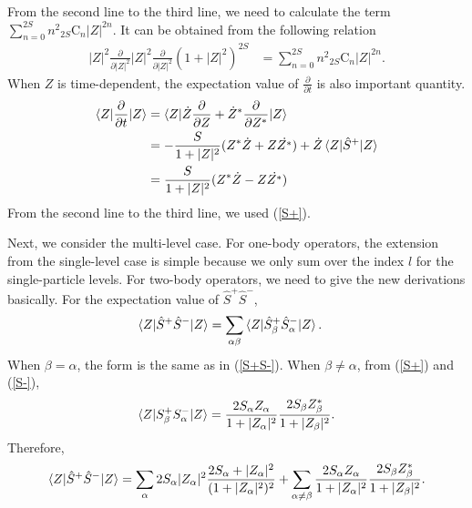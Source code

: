 \documentclass[11pt]{book} %
\begin{document}
From the second line to the third line, we need to calculate the term $\sum_{n=0}^{2S}n^2{}_{2S}\mathrm{C}_n|Z|^{2n}$. It can be obtained from the following relation
\begin{align}
  |Z|^2\frac{\partial}{\partial |Z|^2}|Z|^2\frac{\partial}{\partial |Z|^2}
  (1+|Z|^2)^{2S} &= \sum_{n=0}^{2S}n^2{}_{2S}\mathrm{C}_n|Z|^{2n} .
\end{align}
When $Z$ is time-dependent, the expectation value of $\frac{\partial}{\partial t}$ is also important quantity.
\begin{align}
   \braket{Z|\frac{\partial}{\partial t}|Z} &= \braket{Z|\dot{Z}\frac{\partial}{\partial Z}+\dot{Z}^*\frac{\partial}{\partial Z^*}|Z} \nonumber \\
   &= -\frac{S}{1+|Z|^2}(Z^*\dot{Z}+Z\dot{Z^*}) + \dot{Z}\braket{Z|\hat{S}^+|Z} \nonumber \\
   &= \frac{S}{1+|Z|^2}(Z^*\dot{Z}-Z\dot{Z^*})
\end{align}
From the second line to the third line, we used (\ref{S+}).

Next, we consider the multi-level case. For one-body operators, the extension from the single-level case is simple because we only sum over the index $l$ for the single-particle levels. For two-body operators, we need to give the new derivations basically. For the expectation value of $\hat{S}^+\hat{S}^-$,
\begin{align}
  \braket{Z|\hat{S}^+\hat{S}^-|Z} &= \sum_{\alpha\beta}\braket{Z|\hat{S}_{\beta}^+\hat{S}_{\alpha}^-|Z} .
\end{align}
When $\beta=\alpha$, the form is the same as in (\ref{S+S-}). When $\beta\ne \alpha$, from (\ref{S+}) and (\ref{S-}),
\begin{align}
  \braket{Z|S_{\beta}^+S_{\alpha}^-|Z} = \frac{2S_{\alpha}Z_{\alpha}}{1+|Z_{\alpha}|^2}\frac{2S_{\beta}Z_{\beta}^*}{1+|Z_{\beta}|^2} .
\end{align}
Therefore,
\begin{align}
    \braket{Z|\hat{S}^+\hat{S}^-|Z} = \sum_{\alpha} 2S_{\alpha}|Z_{\alpha}|^2\frac{2S_{\alpha}+|Z_{\alpha}|^2}{(1+|Z_{\alpha}|^2)^2}
    + \sum_{\alpha \neq \beta} \frac{2S_{\alpha}Z_{\alpha}}{1+|Z_{\alpha}|^2}\frac{2S_{\beta}Z_{\beta}^*}{1+|Z_{\beta}|^2} .
\end{align}
\end{document}
